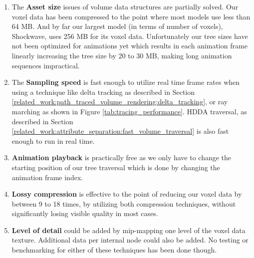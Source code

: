 \begin{enumerate}
    \item The \textbf{Asset size} issues of volume data structures are partially solved. Our voxel data has been compressed to the point where most models use less than 64 MB. And by far our largest model (in terms of number of voxels), Shockwave, uses 256 MB for its voxel data. Unfortunately our tree sizes have not been optimized for animations yet which results in each animation frame linearly increasing the tree size by 20 to 30 MB, making long animation sequences impractical.
    \item The \textbf{Sampling speed} is fast enough to utilize real time frame rates when using a technique like delta tracking as described in Section \ref{related_work:path_traced_volume_rendering:delta_tracking}, or ray marching as shown in Figure \ref{tab:tracing_performance}. HDDA traversal, as described in Section \ref{related_work:attribute_separation:fast_volume_traversal} is also fast enough to run in real time.
    \item \textbf{Animation playback} is practically free as we only have to change the starting position of our tree traversal which is done by changing the animation frame index.
    \item \textbf{Lossy compression} is effective to the point of reducing our voxel data by between 9 to 18 times, by utilizing both compression techniques, without significantly losing visible quality in most cases.
    \item \textbf{Level of detail} could be added by mip-mapping one level of the voxel data texture. Additional data per internal node could also be added. No testing or benchmarking for either of these techniques has been done though.
\end{enumerate}


